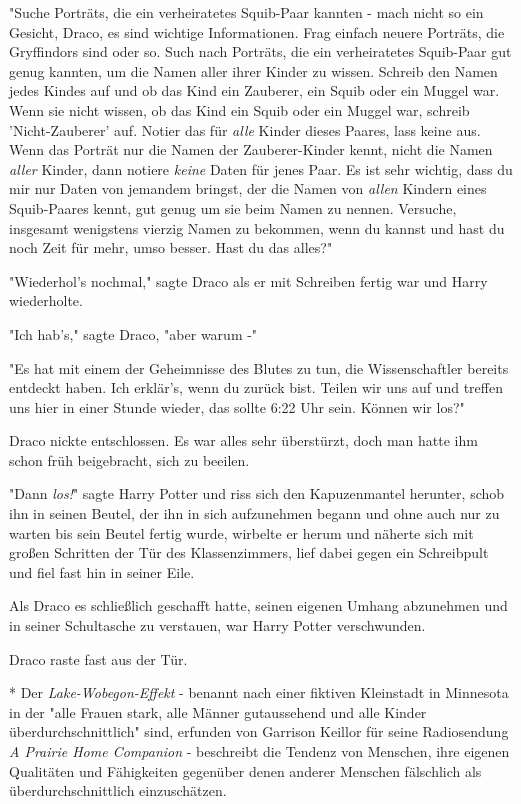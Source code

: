 {"Suche Porträts, die ein verheiratetes Squib-Paar kannten - mach nicht so ein Gesicht, Draco, es sind wichtige Informationen. Frag einfach neuere Porträts, die Gryffindors sind oder so. Such nach Porträts, die ein verheiratetes Squib-Paar gut genug kannten, um die Namen aller ihrer Kinder zu wissen. Schreib den Namen jedes Kindes auf und ob das Kind ein Zauberer, ein Squib oder ein Muggel war. Wenn sie nicht wissen, ob das Kind ein Squib oder ein Muggel war, schreib 'Nicht-Zauberer' auf. Notier das für \emph{alle} Kinder dieses Paares, lass keine aus. Wenn das Porträt nur die Namen der Zauberer-Kinder kennt, nicht die Namen \emph{aller} Kinder, dann notiere \emph{keine} Daten für jenes Paar. Es ist sehr wichtig, dass du mir nur Daten von jemandem bringst, der die Namen von \emph{allen} Kindern eines Squib-Paares kennt, gut genug um sie beim Namen zu nennen. Versuche, insgesamt wenigstens vierzig Namen zu bekommen, wenn du kannst und hast du noch Zeit für mehr, umso besser. Hast du das alles?"

"Wiederhol's nochmal," sagte Draco als er mit Schreiben fertig war und Harry wiederholte.

"Ich hab's," sagte Draco, "aber warum -"

"Es hat mit einem der Geheimnisse des Blutes zu tun, die Wissenschaftler bereits entdeckt haben. Ich erklär's, wenn du zurück bist. Teilen wir uns auf und treffen uns hier in einer Stunde wieder, das sollte 6:22 Uhr sein. Können wir los?"

Draco nickte entschlossen. Es war alles sehr überstürzt, doch man hatte ihm schon früh beigebracht, sich zu beeilen.

"Dann \emph{los!}" sagte Harry Potter und riss sich den Kapuzenmantel herunter, schob ihn in seinen Beutel, der ihn in sich aufzunehmen begann und ohne auch nur zu warten bis sein Beutel fertig wurde, wirbelte er herum und näherte sich mit großen Schritten der Tür des Klassenzimmers, lief dabei gegen ein Schreibpult und fiel fast hin in seiner Eile.

Als Draco es schließlich geschafft hatte, seinen eigenen Umhang abzunehmen und in seiner Schultasche zu verstauen, war Harry Potter verschwunden.

Draco raste fast aus der Tür.

* Der \emph{Lake-Wobegon-Effekt} - benannt nach einer fiktiven Kleinstadt in Minnesota in der "alle Frauen stark, alle Männer gutaussehend und alle Kinder überdurchschnittlich" sind, erfunden von Garrison Keillor für seine Radiosendung \emph{A Prairie Home Companion} - beschreibt die Tendenz von Menschen, ihre eigenen Qualitäten und Fähigkeiten gegenüber denen anderer Menschen fälschlich als überdurchschnittlich einzuschätzen.

}
